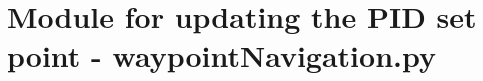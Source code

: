 
\chapter{Module for updating the PID set point - waypointNavigation.py} %

\label{AppendixB} %









